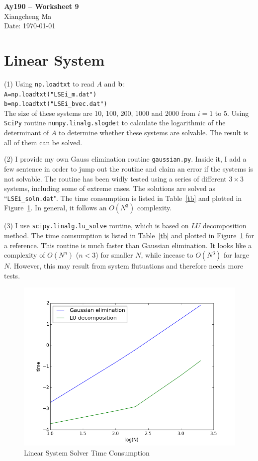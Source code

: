 \documentclass[11pt,letterpaper]{article}
\begin{document}
\begin{center}
\Large
{\bf Ay190 -- Worksheet 9} \\
\large
Xiangcheng Ma \\
Date: \today
\end{center}

\section*{Linear System}
(1) Using {\tt np.loadtxt} to read $A$ and $\bf b$: \\
{\tt A=np.loadtxt("LSEi\_m.dat")} \\
{\tt b=np.loadtxt("LSEi\_bvec.dat")} \\

The size of these systems are 10, 100, 200, 1000 and 2000 from $i=1$ to $5$. Using {\tt SciPy} routine {\tt numpy.linalg.slogdet} to calculate the logarithmic of the determinant of $A$ to determine whether these systems are solvable. The result is all of them can be solved.

(2) I provide my own Gauss elimination routine {\tt gaussian.py}. Inside it, I add a few sentence in order to jump out the routine and claim an error if the systems is not solvable. The routine has been widly tested using a series of different $3\times3$ systems, including some of extreme cases. The solutions are solved as ``{\tt LSEi\_soln.dat}". The time consumption is listed in Table~\ref{tb} and plotted in Figure~\ref{fig}. In general, it follows an $O(N^3)$ complexity.

(3) I use {\tt scipy.linalg.lu\_solve} routine, which is based on $LU$ decomposition method. The time comsumption is listed in Table~\ref{tb} and plotted in Figure~\ref{fig} for a reference. This routine is much faster than Gaussian elimination. It looks like a complexity of $O(N^n)$ ($n<3$) for smaller $N$, while incease to $O(N^3)$ for large $N$. However, this may result from system flutuations and therefore needs more tests.


\begin{figure}[th]
\centering
\includegraphics[width=1.0\textwidth]{fig.png}
\caption{Linear System Solver Time Consumption}
\label{fig}
\end{figure}
\end{document}
